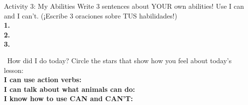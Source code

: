 \begin{activity}{Activity 3: My Abilities}
  Write 3 sentences about YOUR own abilities! Use I can and I can't. (¡Escribe 3 oraciones sobre TUS habilidades!)\\
  \textbf{1.} \answerline[8cm]\\
  \textbf{2.} \answerline[8cm]\\
  \textbf{3.} \answerline[8cm]
\end{activity}

\vspace{1em}
\begin{grammartip}{ \ How did I do today?}
  Circle the stars that show how you feel about today's lesson:\\[6pt]
  \textbf{I can use action verbs:} \selfcheck[0] \\[4pt]
  \textbf{I can talk about what animals can do:} \selfcheck[0] \\[4pt]
  \textbf{I know how to use CAN and CAN'T:} \selfcheck[0]
\end{grammartip}
